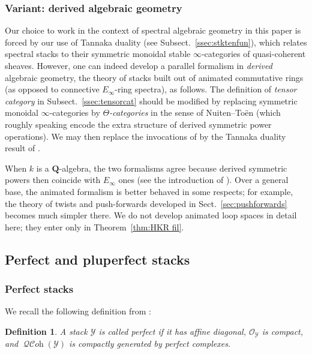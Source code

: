 \documentclass[12pt, oneside]{amsart}
\numberwithin{equation}{section}
\newtheorem{definition}[subsubsection]{Definition}
\theoremstyle{remark}
\theoremstyle{plain}
\DeclareMathOperator{\QCOH}{\mathcal{QC}\textit{oh}}
\newcommand{\OO}{\mathcal{O}}
\newcommand{\YY}{\mathcal{Y}}
\newcommand{\bQ}{\mathbf{Q}}
\begin{document}
\subsubsection{Variant: derived algebraic geometry}\label{sssec:dagreview/animated}

Our choice to work in the context of spectral algebraic geometry in this paper is forced by our use of Tannaka duality (see Subsect.~\ref{ssec:stktenfun}), which relates spectral stacks to their symmetric monoidal stable $\infty$-categories of quasi-coherent sheaves.
However, one can indeed develop a parallel formalism in \emph{derived} algebraic geometry, the theory of stacks built out of animated commutative rings (as opposed to connective $E_\infty$-ring spectra), as follows.
The definition of \emph{tensor category} in Subsect.~\ref{ssec:tensorcat} should be modified by replacing symmetric monoidal $\infty$-categories by \emph{$\Theta$-categories} in the sense of Nuiten--To\"en \cite{NuitenToen} (which roughly speaking encode the extra structure of derived symmetric power operations).
We may then replace the invocations of \cite[Thm.~1.3]{BHL} by the Tannaka duality result of \cite[Thm.~6.1.5]{MundingerSahai}.

When $k$ is a $\bQ$-algebra, the two formalisms agree because derived symmetric powers then coincide with $E_\infty$ ones (see the introduction of \cite{NuitenToen}).
Over a general base, the animated formalism is better behaved in some respects; for example, the theory of twists and push-forwards developed in Sect.~\ref{sec:pushforwards} becomes much simpler there.
We do not develop animated loop spaces in detail here; they enter only in Theorem~\ref{thm:HKR fil}.

\subsection{Perfect and pluperfect stacks}

\subsubsection{Perfect stacks}

We recall the following definition from \cite{BFN}:

\begin{definition}\label{def:perfect}
  A stack $\YY$ is called \emph{perfect} if it has affine diagonal, $\OO_\YY$ is compact, and $\QCOH(\YY)$ is compactly generated by perfect complexes.
\end{definition}
\end{document}
